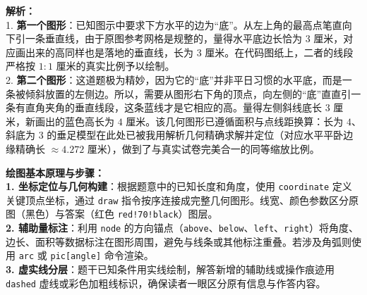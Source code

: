 \begin{center}
\end{center}

\vspace{0.6cm}
{\small\color{gray}
\textbf{解析：}\\
1. \textbf{第一个图形}：已知图示中要求下方水平的边为“底”。从左上角的最高点笔直向下引一条垂直线，由于原图参考网格是规整的，量得水平底边长恰为 $3$ 厘米，对应画出来的高同样也是落地的垂直线，长为 $3$ 厘米。在代码图纸上，二者的线段严格按 $1:1$ 厘米的真实比例予以绘制。\\
2. \textbf{第二个图形}：这道题极为精妙，因为它的“底”并非平日习惯的水平底，而是一条被倾斜放置的左侧边。所以，需要从图形右下角的顶点，向左侧的“底”直直引一条有直角夹角的垂直线段，这条蓝线才是它相应的高。量得左侧斜线底长 $3$ 厘米，新画出的蓝色高长为 $4$ 厘米。该几何图形已遵循面积与点线距换算：长为 $4$、斜底为 $3$ 的垂足模型在此处已被我用解析几何精确求解并定位（对应水平平卧边缘精确长 $\approx 4.272$ 厘米），做到了与真实试卷完美合一的同等缩放比例。
}


\vspace{0.6cm}

{\small\color{blue!70!black}
\textbf{绘图基本原理与步骤：}\\
\textbf{1. 坐标定位与几何构建}：根据题意中的已知长度和角度，使用 \texttt{coordinate} 定义关键顶点坐标，通过 \texttt{draw} 指令按序连接成完整几何图形。线宽、颜色参数区分原图（黑色）与答案（红色 \texttt{red!70!black}）图层。\\
\textbf{2. 辅助量标注}：利用 \texttt{node} 的方向锚点（\texttt{above}、\texttt{below}、\texttt{left}、\texttt{right}）将角度、边长、面积等数据标注在图形周围，避免与线条或其他标注重叠。若涉及角弧则使用 \texttt{arc} 或 \texttt{pic[angle]} 命令渲染。\\
\textbf{3. 虚实线分层}：题干已知条件用实线绘制，解答新增的辅助线或操作痕迹用 \texttt{dashed} 虚线或彩色加粗线标识，确保读者一眼区分原有信息与作答内容。
}



